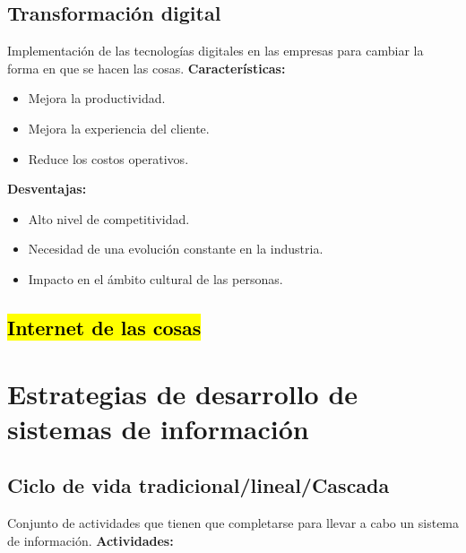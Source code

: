 \documentclass{templateNote}
\begin{document}
\subsection{Transformación digital}
\noindent Implementación de las tecnologías digitales en las empresas para cambiar la forma en que se hacen las cosas.
\textbf{Características:}
\begin{itemize}
    \item Mejora la productividad.
    \item Mejora la experiencia del cliente.
    \item Reduce los costos operativos.
\end{itemize}
\textbf{Desventajas:}
\begin{itemize}
    \item Alto nivel de competitividad.
    \item Necesidad de una evolución constante en la industria.
    \item Impacto en el ámbito cultural de las personas.
\end{itemize}

\subsection{\hl{Internet de las cosas}}
\newpage

\section{Estrategias de desarrollo de sistemas de información}
\subsection{Ciclo de vida tradicional/lineal/Cascada}
\noindent Conjunto de actividades que tienen que completarse para llevar a cabo un sistema de información. \linebreak
\textbf{Actividades:}
\begin{center}
\end{center}
\end{document}
